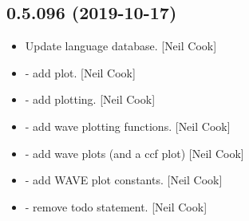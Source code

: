 \documentclass[a4paper,10pt,english]{report}
\begin{document}
\subsection{0.5.096 (2019-10-17)}
\label{\detokenize{misc/changelog:id46}}\begin{itemize}
\item {} 
Update language database. {[}Neil Cook{]}

\item {} 
 - add  plot. {[}Neil Cook{]}

\item {} 
 - add plotting. {[}Neil Cook{]}

\item {} 
 - add wave plotting functions. {[}Neil Cook{]}

\item {} 
 - add wave plots (and a
ccf plot) {[}Neil Cook{]}

\item {} 
 - add WAVE plot constants.
{[}Neil Cook{]}

\item {} 
 - remove todo statement. {[}Neil Cook{]}

\end{itemize}
\end{document}
